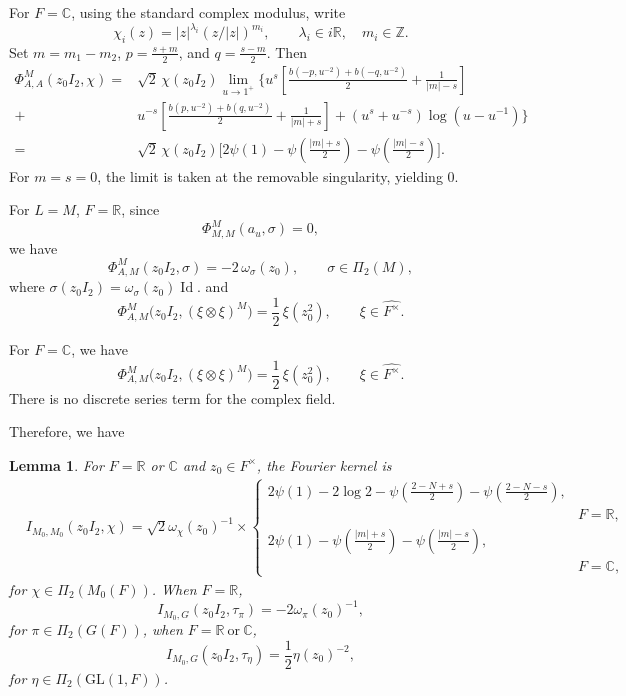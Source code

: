 \documentclass[11pt]{amsart}
\newtheorem {lemma}      [theorem]    {Lemma}
\theoremstyle{definition}
\numberwithin{equation}{section}
\begin{document}
	For \(F = \mathbb{C}\), using the standard complex modulus, write
	\[
	\chi_i(z) = |z|^{\lambda_i} (z/|z|)^{m_i},
	\qquad \lambda_i \in i\mathbb{R}, \quad m_i \in \mathbb{Z}.
	\]
	Set \(m = m_1 - m_2\), \(p = \frac{s + m}{2}\), and \(q = \frac{s - m}{2}\). Then
	\begin{equation*}
		\begin{aligned}
			\Phi^M_{A,A}(z_0I_2,\chi)
			=&\sqrt2\, \chi(z_0 I_2)\lim_{u\to1^+}\Bigg\{u^s\left[
			\frac{b(-p,u^{-2})+b(-q,u^{-2})}{2}
			+\frac1{|m|-s}\right]\\
			+&u^{-s}\left[
			\frac{b(p,u^{-2})+b(q,u^{-2})}{2}
			+\frac1{|m|+s}\right]+(u^s+u^{-s})\log(u-u^{-1})\Bigg\}\\
			=& \sqrt{2}\, \chi(z_0 I_2) \Bigg[ 
			2\psi(1) -\psi\!\left(\frac{|m| + s}{2}\right)-\psi\!\left(\frac{|m| - s}{2}\right) 
			\Bigg].
		\end{aligned}
	\end{equation*}
	For \(m = s = 0\), the limit is taken at the removable singularity, yielding \(0\).
	
	For \(L=M\), \(F=\mathbb{R}\), since \[\Phi^M_{M,M}(a_u,\sigma)=0,\] we have
	\begin{equation*}
		\Phi^M_{A,M}(z_0 I_2, \sigma) = -2 \, \omega_\sigma(z_0),
		\qquad \sigma \in \Pi_2(M),
	\end{equation*}
	where \(\sigma(z_0 I_2) = \omega_\sigma(z_0) \operatorname{Id}\). and \[
	\Phi^M_{A,M}\bigl(z_0I_2,(\xi\otimes\xi)^M\bigr)
	=\frac12\,\xi(z_0^2),
	\qquad \xi\in\widehat{F^\times}.
	\]
	
	For \(F=\mathbb{C}\), we have
	\begin{equation*}
		\Phi^M_{A,M}\bigl(z_0 I_2, (\xi \otimes \xi)^M\bigr) 
		= \frac{1}{2} \, \xi(z_0^2),
		\qquad \xi \in \widehat{F^\times}.
	\end{equation*}
	There is no discrete series term for the complex field.
	
	Therefore, we have 
	\begin{lemma}
		For \(F=\mathbb R\) or \(\mathbb C\) and \(z_0\in F^\times\), the Fourier kernel is
		\begin{align*}
			&I_{M_0,M_0}(z_0I_2,\chi)
			=\sqrt2\omega_\chi(z_0)^{-1}\times
			\begin{cases}
				\displaystyle
				2\psi(1)-2\log2
				-\psi\left(\frac{2-N+s}{2}\right)
				-\psi\left(\frac{2-N-s}{2}\right),\\
				&F=\mathbb R,\\
				\displaystyle
				2\psi(1)
				-\psi\left(\frac{|m|+s}{2}\right)
				-\psi\left(\frac{|m|-s}{2}\right),\\
				&F=\mathbb C,
			\end{cases}
		\end{align*}
		for \(\chi\in\Pi_2(M_0(F))\). When \(F=\mathbb R\),
		\[
		I_{M_0,G}(z_0I_2,\tau_\pi)
		=-2\omega_\pi(z_0)^{-1},
		\]
		for \(\pi\in\Pi_2(G(F))\), when \(F=\mathbb{R}\ \text{or}\ \mathbb{C}\),
		\[
		I_{M_0,G}(z_0I_2,\tau_\eta)
		=\frac{1}{2}\eta(z_0)^{-2},
		\]
		for \(\eta\in\Pi_2(\mathrm{GL}(1,F))\).
	\end{lemma}
	
\end{document}
